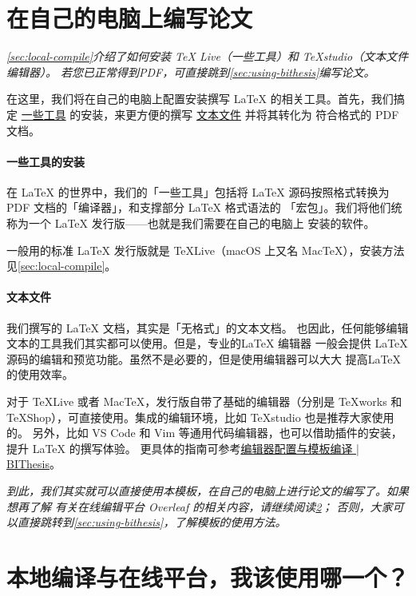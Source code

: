 \section{在自己的电脑上编写论文}

\textit{
\cref{sec:local-compile}介绍了如何安装 TeX Live（一些工具）和 TeXstudio（文本文件编辑器）。
若您已正常得到PDF，可直接跳到\cref{sec:using-bithesis}编写论文。
}

在这里，我们将在自己的电脑上配置安装撰写 \LaTeX{} 的相关工具。首先，我们搞定
\underline{一些工具} 的安装，来更方便的撰写 \underline{文本文件} 并将其转化为
符合格式的 PDF 文档。

\paragraph{一些工具的安装} 在 \LaTeX{} 的世界中，我们的「一些工具」包括将
\LaTeX{} 源码按照格式转换为 PDF 文档的「编译器」，和支撑部分 \LaTeX{} 格式语法的
「宏包」。我们将他们统称为一个 \LaTeX{} 发行版——也就是我们需要在自己的电脑上
安装的软件。

一般用的标准 \LaTeX{} 发行版就是 \TeX{}Live（macOS 上又名 Mac\TeX{}），安装方法见\autoref{sec:local-compile}。

\paragraph{文本文件} 我们撰写的 \LaTeX{} 文档，其实是「无格式」的文本文档。
也因此，任何能够编辑文本的工具我们其实都可以使用。但是，专业的\LaTeX{} 编辑器
一般会提供 \LaTeX{} 源码的编辑和预览功能。虽然不是必要的，但是使用编辑器可以大大
提高\LaTeX{} 的使用效率。

对于 \TeX{}Live 或者 Mac\TeX，发行版自带了基础的编辑器（分别是 \TeX{}works 和
\TeX{}Shop），可直接使用。集成的编辑环境，比如 \TeX{}studio 也是推荐大家使用的。
另外，比如 VS Code 和 Vim 等通用代码编辑器，也可以借助插件的安装，提升 \LaTeX{}
的撰写体验。
更具体的指南可参考\href{https://bithesis.bitnp.net/guide/configure-and-compile.html}{编辑器配置与模板编译 | BIThesis}。

\textit{
到此，我们其实就可以直接使用本模板，在自己的电脑上进行论文的编写了。如果想再了解
有关在线编辑平台 Overleaf 的相关内容，请继续阅读\cref{sec:online-overleaf}；
否则，大家可以直接跳转到\cref{sec:using-bithesis}，了解模板的使用方法。
}

\section{本地编译与在线平台，我该使用哪一个？}
\label{sec:online-overleaf}

